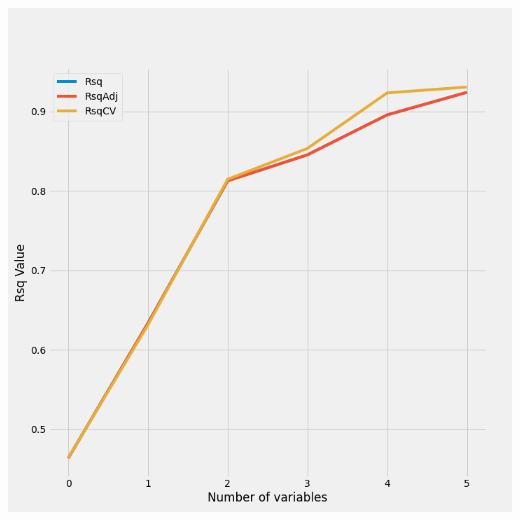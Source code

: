 \documentclass{article}
\begin{document}
	\includegraphics[scale = 0.2]{../plots/python/Stepwise3L.png}
	
\end{document}
